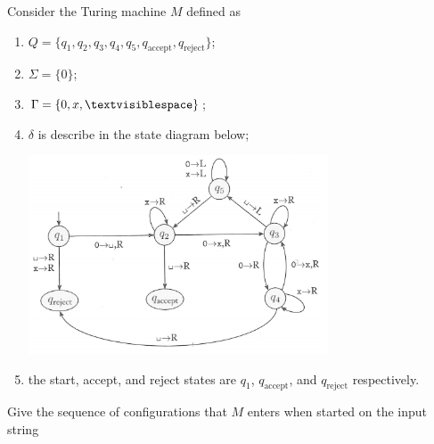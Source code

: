 \question Consider the Turing machine $M$ defined as
\begin{enumerate}
    \item $Q = \{ q_1, q_2, q_3, q_4, q_5, q_\text{accept}, q_\text{reject} \}$;
    \item $\Sigma = \{ 0 \}$;
    \item $\Gamma = \{ 0, x, \textvisiblespace \}$;
    \item $\delta$ is describe in the state diagram below;
        \begin{center}
            \includegraphics[width=0.7\textwidth]{images/turing-machine-01.png}
        \end{center}
    \item the start, accept, and reject states are $q_1$, $q_\text{accept}$, and $q_\text{reject}$ respectively.
\end{enumerate}
Give the sequence of configurations that $M$ enters when started on the input string

